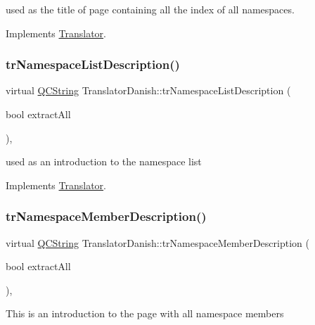 used as the title of page containing all the index of all namespaces. 

Implements \mbox{\hyperlink{class_translator}{Translator}}.

\mbox{\label{class_translator_danish_aaf42e62866517b736531d676197bf7bb}} 
\subsubsection{\texorpdfstring{trNamespaceListDescription()}{trNamespaceListDescription()}}
{\footnotesize\ttfamily virtual \mbox{\hyperlink{class_q_c_string}{Q\+C\+String}} Translator\+Danish\+::tr\+Namespace\+List\+Description (\begin{DoxyParamCaption}\item[{bool}]{extract\+All }\end{DoxyParamCaption})\hspace{0.3cm}{\ttfamily [inline]}, {\ttfamily [virtual]}}

used as an introduction to the namespace list 

Implements \mbox{\hyperlink{class_translator}{Translator}}.

\mbox{\label{class_translator_danish_a36db40efda78a5865fcee126d42d7f63}} 
\subsubsection{\texorpdfstring{trNamespaceMemberDescription()}{trNamespaceMemberDescription()}}
{\footnotesize\ttfamily virtual \mbox{\hyperlink{class_q_c_string}{Q\+C\+String}} Translator\+Danish\+::tr\+Namespace\+Member\+Description (\begin{DoxyParamCaption}\item[{bool}]{extract\+All }\end{DoxyParamCaption})\hspace{0.3cm}{\ttfamily [inline]}, {\ttfamily [virtual]}}

This is an introduction to the page with all namespace members 

